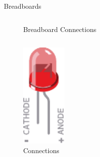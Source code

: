 \begin{frame}{Breadboards}
\begin{columns}[t]
\begin{column}{0.5\textwidth}
\begin{figure}
                \caption{Breadboard Connections}
            \end{figure}
        \end{column}
    \end{columns}
\end{frame}



\begin{frame}{}
    \begin{figure}
        \includegraphics[width=0.2\textwidth]{images/microcontroller/led.pdf}
        \caption{ Connections}
    \end{figure}
\end{frame}


